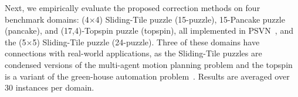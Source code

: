 \documentclass[letterpaper]{article}
\begin{document}

Next, we empirically evaluate the proposed correction methods %
on four benchmark domains:
(4$\times$4) Sliding-Tile puzzle (15-puzzle), 15-Pancake puzzle (pancake), and (17,4)-Topspin puzzle (topspin), all implemented in PSVN~\cite{psvn}, and the (5$\times$5) Sliding-Tile puzzle (24-puzzle). %
Three of these domains have connections with real-world applications, as the Sliding-Tile puzzles are condensed versions of the multi-agent motion planning problem and the topspin is a variant of the green-house automation problem~\cite{HelmertL10}. %
Results are averaged over 30 instances per domain. 


\end{document}
